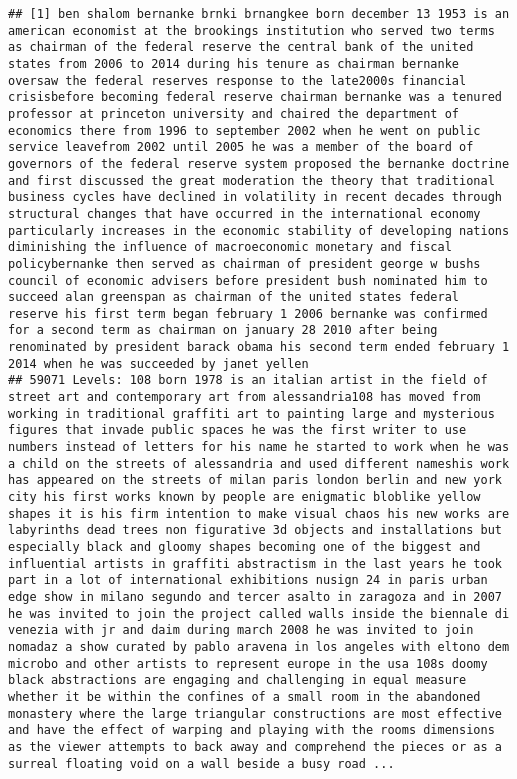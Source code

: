 \documentclass[
]{article}
\begin{document}
\begin{verbatim}
## [1] ben shalom bernanke brnki brnangkee born december 13 1953 is an american economist at the brookings institution who served two terms as chairman of the federal reserve the central bank of the united states from 2006 to 2014 during his tenure as chairman bernanke oversaw the federal reserves response to the late2000s financial crisisbefore becoming federal reserve chairman bernanke was a tenured professor at princeton university and chaired the department of economics there from 1996 to september 2002 when he went on public service leavefrom 2002 until 2005 he was a member of the board of governors of the federal reserve system proposed the bernanke doctrine and first discussed the great moderation the theory that traditional business cycles have declined in volatility in recent decades through structural changes that have occurred in the international economy particularly increases in the economic stability of developing nations diminishing the influence of macroeconomic monetary and fiscal policybernanke then served as chairman of president george w bushs council of economic advisers before president bush nominated him to succeed alan greenspan as chairman of the united states federal reserve his first term began february 1 2006 bernanke was confirmed for a second term as chairman on january 28 2010 after being renominated by president barack obama his second term ended february 1 2014 when he was succeeded by janet yellen
## 59071 Levels: 108 born 1978 is an italian artist in the field of street art and contemporary art from alessandria108 has moved from working in traditional graffiti art to painting large and mysterious figures that invade public spaces he was the first writer to use numbers instead of letters for his name he started to work when he was a child on the streets of alessandria and used different nameshis work has appeared on the streets of milan paris london berlin and new york city his first works known by people are enigmatic bloblike yellow shapes it is his firm intention to make visual chaos his new works are labyrinths dead trees non figurative 3d objects and installations but especially black and gloomy shapes becoming one of the biggest and influential artists in graffiti abstractism in the last years he took part in a lot of international exhibitions nusign 24 in paris urban edge show in milano segundo and tercer asalto in zaragoza and in 2007 he was invited to join the project called walls inside the biennale di venezia with jr and daim during march 2008 he was invited to join nomadaz a show curated by pablo aravena in los angeles with eltono dem microbo and other artists to represent europe in the usa 108s doomy black abstractions are engaging and challenging in equal measure whether it be within the confines of a small room in the abandoned monastery where the large triangular constructions are most effective and have the effect of warping and playing with the rooms dimensions as the viewer attempts to back away and comprehend the pieces or as a surreal floating void on a wall beside a busy road ...
\end{verbatim}
\end{document}
